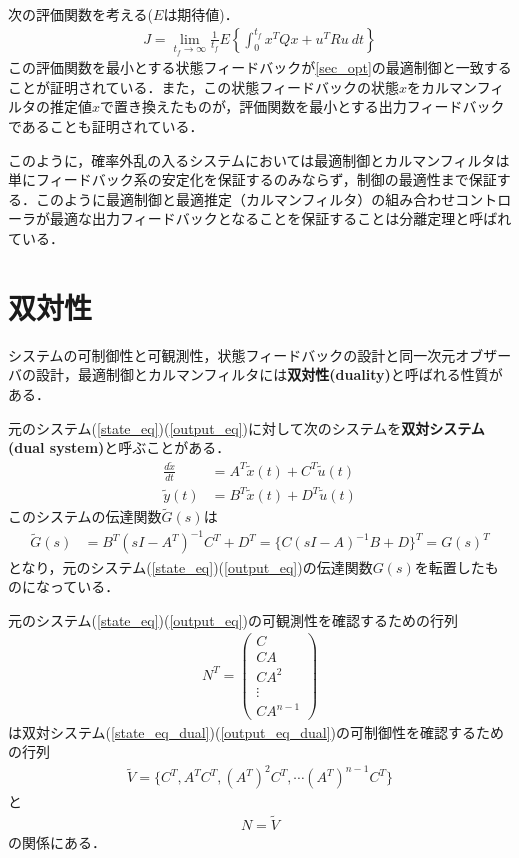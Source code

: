 次の評価関数を考える($E$は期待値)．
\begin{align}
  J=\lim_{t_f \rightarrow \infty} \frac{1}{t_f} E \left\{\int_0^{t_f} x^T Q x + u^T R u \ dt \right\}
\end{align}
この評価関数を最小とする状態フィードバックが\ref{sec_opt}の最適制御と一致することが証明されている．また，この状態フィードバックの状態$x$をカルマンフィルタの推定値$\hat{x}$で置き換えたものが，評価関数を最小とする出力フィードバックであることも証明されている．

このように，確率外乱の入るシステムにおいては最適制御とカルマンフィルタは単にフィードバック系の安定化を保証するのみならず，制御の最適性まで保証する．このように最適制御と最適推定（カルマンフィルタ）の組み合わせコントローラが最適な出力フィードバックとなることを保証することは分離定理と呼ばれている．


\section{双対性}

システムの可制御性と可観測性，状態フィードバックの設計と同一次元オブザーバの設計，最適制御とカルマンフィルタには{\bf 双対性(duality)}と呼ばれる性質がある．

元のシステム(\ref{state_eq})(\ref{output_eq})に対して次のシステムを{\bf 双対システム(dual system)}と呼ぶことがある．
\begin{align}
 \frac{d \tilde{x}}{dt} &= A^T \tilde{x}(t) + C^T \tilde{u}(t) \label{state_eq_dual} \\
 \tilde{y}(t) &= B^T \tilde{x}(t) + D^T \tilde{u}(t) \label{output_eq_dual}
\end{align}
このシステムの伝達関数$\tilde{G}(s)$は
\begin{align}
	\tilde{G}(s) &= B^T (sI-A^T)^{-1} C^T + D^T = \{C(sI-A)^{-1}B + D\}^T = G(s)^T
\end{align}
となり，元のシステム(\ref{state_eq})(\ref{output_eq})の伝達関数$G(s)$を転置したものになっている．

元のシステム(\ref{state_eq})(\ref{output_eq})の可観測性を確認するための行列
\begin{align}
 N^T =
  \left( \begin{array}{c}
         C        \\
	 C A      \\
	 C A^2    \\
	 \vdots   \\
	 C A^{n-1}
  \end{array} \right)
\nonumber
\end{align}
は双対システム(\ref{state_eq_dual})(\ref{output_eq_dual})の可制御性を確認するための行列
\begin{align}
     \tilde{V} = \{C^T, A^T C^T, (A^T)^2 C^T , \cdots (A^T)^{n-1} C^T　\}
\nonumber
\end{align}
と
\begin{align}
  N = \tilde{V}
\end{align}
の関係にある．

